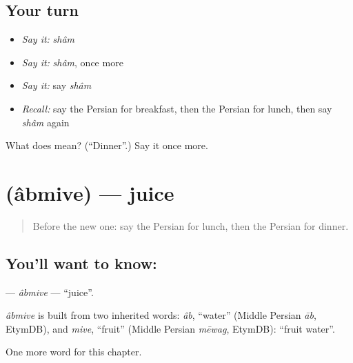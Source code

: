 \subsection*{Your turn}
\begin{itemize}
\raggedright
  \item \emph{Say it:} \emph{shâm}
  \item \emph{Say it:} \emph{shâm}, once more
  \item \emph{Say it:} say \emph{shâm}
  \item \emph{Recall:} say the Persian for breakfast, then the Persian for lunch, then say \emph{shâm} again
\end{itemize}

\begin{tcolorbox}[breakable,colback=teal!4,colframe=teal!35!black,title={Before you move on}]
What does  mean? (\textquotedblleft{}Dinner\textquotedblright{}.) Say it once more.
\end{tcolorbox}
\section[\texorpdfstring{\fa{آبمیوه} (âbmive)}{آبمیوه (âbmive)}]{ (âbmive) — juice}

\label{lesson:FA-C44-abmive}



\begin{quote}
Before the new one: say the Persian for lunch, then the Persian for dinner.
\end{quote}

\subsection*{You'll want to know: }
\textbf{} — \emph{âbmive} — \textquotedblleft{}juice\textquotedblright{}.

\begin{cousinweb}
\emph{âbmive} is built from two inherited words: \emph{âb}, \textquotedblleft{}water\textquotedblright{} (Middle Persian \emph{āb}, EtymDB), and \emph{mive}, \textquotedblleft{}fruit\textquotedblright{} (Middle Persian \emph{mēwag}, EtymDB): \textquotedblleft{}fruit water\textquotedblright{}.
\end{cousinweb}

\begin{grammarlens}[title={What you've built}]
One more word for this chapter.
\end{grammarlens}

